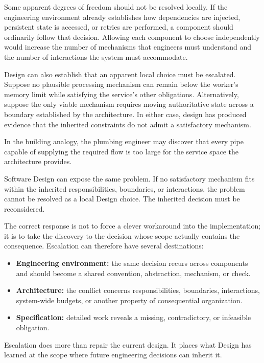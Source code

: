 Some apparent degrees of freedom should not be resolved locally.
If the engineering environment already establishes how dependencies are injected, persistent state is accessed, or retries are performed, a component should ordinarily follow that decision.
Allowing each component to choose independently would increase the number of mechanisms that engineers must understand and the number of interactions the system must accommodate.

Design can also establish that an apparent local choice must be escalated.
Suppose no plausible processing mechanism can remain below the worker's memory limit while satisfying the service's other obligations.
Alternatively, suppose the only viable mechanism requires moving authoritative state across a boundary established by the architecture.
In either case, design has produced evidence that the inherited constraints do not admit a satisfactory mechanism.

In the building analogy, the plumbing engineer may discover that every pipe capable of supplying the required flow is too large for the service space the architecture provides.

Software Design can expose the same problem.
If no satisfactory mechanism fits within the inherited responsibilities, boundaries, or interactions, the problem cannot be resolved as a local Design choice.
The inherited decision must be reconsidered.

The correct response is not to force a clever workaround into the implementation; it is to take the discovery to the decision whose scope actually contains the consequence.
Escalation can therefore have several destinations:

\begin{itemize}
\tightlist
\item
  \textbf{Engineering environment:} the same decision recurs across components and should become a shared convention, abstraction, mechanism, or check.
\item
  \textbf{Architecture:} the conflict concerns responsibilities, boundaries, interactions, system-wide budgets, or another property of consequential organization.
\item
  \textbf{Specification:} detailed work reveals a missing, contradictory, or infeasible obligation.
\end{itemize}

Escalation does more than repair the current design.
It places what Design has learned at the scope where future engineering decisions can inherit it.


